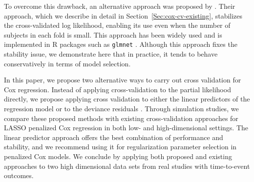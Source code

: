 


\par To overcome this drawback, an alternative approach was proposed by \citet{Verweij1993}.  Their approach, which we describe in detail in Section~\ref{Sec:cox-cv-existing}, stabilizes the cross-validated log likelihood, enabling its use even when the number of subjects in each fold is small.  This approach has been widely used and is implemented in R packages such as {\tt glmnet} \citep{glmnet}.  Although this approach fixes the stability issue, we demonstrate here that in practice, it tends to behave conservatively in terms of model selection.

\par In this paper, we propose two alternative ways to carry out cross validation for Cox regression. Instead of applying cross-validation to the partial likelihood directly, we propose applying cross validation to either the linear predictors of the regression model or to the deviance residuals \citep{Therneau1990}. Through simulation studies, we compare these proposed methods with existing cross-validation approaches for LASSO penalized Cox regression in both low- and high-dimensional settings.  %
The linear predictor approach offers the best combination of performance and stability, and we recommend using it for regularization parameter selection in penalized Cox models.  We conclude by applying both proposed and existing approaches to two high dimensional data sets from real studies with time-to-event outcomes.

